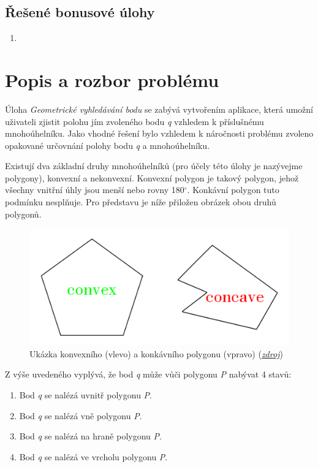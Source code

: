 \documentclass[a4paper, 12pt]{article}
\begin{document}
\subsection{Řešené bonusové úlohy}
\begin{enumerate}
\item 
\end{enumerate}


\clearpage

\section{Popis a rozbor problému}
Úloha \textit{Geometrické vyhledávání bodu} se zabývá vytvořením aplikace, která umožní uživateli zjistit polohu jím zvoleného bodu \textit{q} vzhledem k příslušnému mnohoúhelníku. Jako vhodné řešení bylo vzhledem k náročnosti problému zvoleno opakované určovnání polohy  bodu \textit{q} a mnohoúhelníku.

Existují dva základní druhy mnohoúhelníků (pro účely této úlohy je nazývejme polygony), konvexní a nekonvexní. Konvexní polygon je takový polygon, jehož všechny vnitřní úhly jsou menší nebo rovny 180$^\circ$. Konkávní polygon tuto podmínku nesplňuje. Pro představu je níže přiložen obrázek obou druhů polygonů.

\begin{figure}[h!]
	\centering
	\includegraphics[width=13cm]{./pictures/convex_concave.png}
	\caption{Ukázka konvexního (vlevo) a konkávního polygonu (vpravo) (\href{https://www.nextgurukul.in/nganswers/ask-question/answer/What-is-concave-38-convex-polygon-/Understanding-Quadrilaterals/75323.htm}{\textsl{zdroj}})}
\end{figure}

Z výše uvedeného vyplývá, že bod \textit{q} může vůči polygonu \textit{P} nabývat 4 stavů:
\begin{enumerate}
\item Bod \textit{q} se nalézá uvnitř polygonu \textit{P}.
\item Bod \textit{q} se nalézá vně polygonu \textit{P}.
\item Bod \textit{q} se nalézá na hraně polygonu \textit{P}.
\item Bod \textit{q} se nalézá ve vrcholu polygonu \textit{P}.
\end{enumerate}
\end{document}
